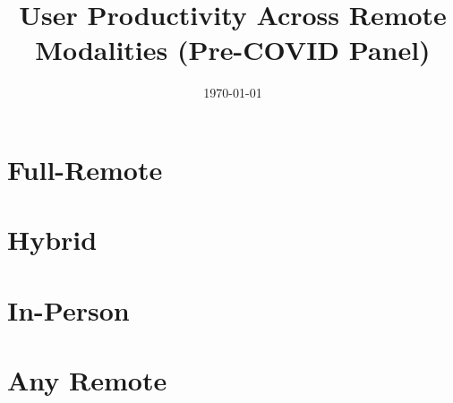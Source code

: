 \documentclass{article}
\begin{document}
\title{User Productivity Across Remote Modalities (Pre-COVID Panel)}
\author{}
\date{\today}
\maketitle

\section*{Full-Remote}


\clearpage
\section*{Hybrid}


\clearpage
\section*{In-Person}


\clearpage
\section*{Any Remote}

\end{document}
